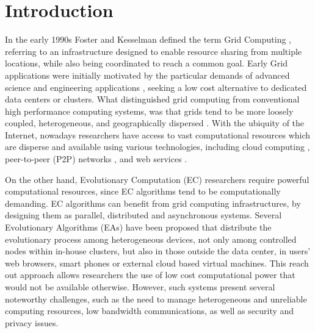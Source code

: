 \section{Introduction}
\label{sec:intro}

In the early 1990s Foster and Kesselman defined the term Grid Computing \cite{Foster:1998}, referring to an infrastructure designed to enable resource sharing from multiple locations, while also being coordinated to reach a common goal. Early Grid applications were initially motivated by the particular demands of advanced science and engineering applications \cite{Baxevanidis:2002}, seeking a low cost alternative to dedicated data centers or clusters. What distinguished grid computing from conventional high performance computing systems, was that grids tend to be more loosely coupled, heterogeneous, and geographically dispersed \cite{Foster:1998}. With the ubiquity of the Internet, nowadays researchers have access to vast  computational resources which are disperse and available using various technologies, including cloud computing \cite{cloud,varia2008cloud}, peer-to-peer (P2P) networks  \cite{Oram:2001}, and web services \cite{Curbera:2002}.

On the other hand, Evolutionary Computation (EC) researchers require powerful computational resources, since EC algorithms tend to be computationally demanding. EC algorithms can benefit from grid computing infrastructures, by designing them as parallel, distributed and asynchronous systems. Several Evolutionary Algorithms (EAs) have been proposed that distribute the evolutionary process among heterogeneous devices, not only among controlled nodes within in-house clusters, but also in those outside the data center, in users' web browsers, smart phones or external cloud based virtual machines. This reach out approach allows researchers the use of low cost computational power that would not be available otherwise.
However, such systems present several noteworthy challenges, such as the need to manage heterogeneous and unreliable computing resources,
low bandwidth communications, as well as security and privacy issues. 
 

